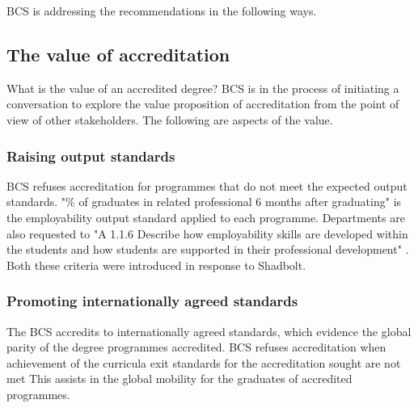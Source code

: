 \documentclass[sigconf]{acmart}
\begin{document}
BCS is addressing the recommendations in the following ways.

\subsection{The value of accreditation}
What is the value of an accredited degree?  BCS is in the process of initiating a conversation to explore the value proposition of accreditation from the point of view of other stakeholders. The following are aspects of the value.
\subsubsection{Raising output standards}
\begin{comment}
BCS refuses accreditation for programmes that do not meet the expected output standards or when achievement of the curricula exit standards for the accreditation sought are not met. "\% of graduates in related professional 6 months after graduating" \cite[p8]{BCS2019b} is the employability output standard applied to each programme. Departments are also requested to  "A 1.1.6 Describe how employability skills are developed within the students and how students are supported in their professional development" \cite [p3]{BCS2019b}. Both these criteria were introduced in response to Shadbolt.
\end{comment}
BCS refuses accreditation for programmes that do not meet the expected output standards. "\% of graduates in related professional 6 months after graduating" \cite[p8]{BCS2019b} is the employability output standard applied to each programme. Departments are also requested to  "A 1.1.6 Describe how employability skills are developed within the students and how students are supported in their professional development" \cite [p3]{BCS2019b}. Both these criteria were introduced in response to Shadbolt.
\subsubsection{Promoting internationally agreed standards}
The BCS accredits to internationally agreed standards, which evidence the global parity of the degree programmes accredited. BCS refuses accreditation when achievement of the curricula exit standards for the accreditation sought are not met  This assists in the global mobility for the graduates of accredited programmes.
\end{document}
